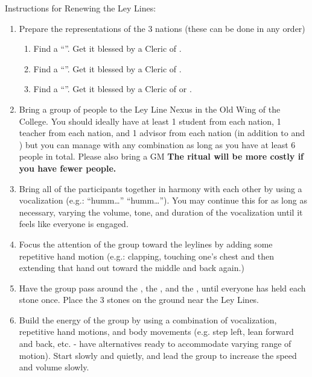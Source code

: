 \documentclass[green]{GL2020}
\begin{document}
Instructions for Renewing the Ley Lines:
\begin{enumerate}
  \item Prepare the representations of the 3 nations (these can be done in any order)
  \begin{enumerate}
    \item Find a ``\iClay{}''. Get it blessed by a Cleric of \cFarmGod{}.
    \item Find a ``\iObsidian{}''. Get it blessed by a Cleric of \cTechGod{}.
    \item Find a ``\iLimestone{}''. Get it blessed by a Cleric of \cEbb{} or \cFlow{}.
  \end{enumerate}  
  \item Bring a group of people to the Ley Line Nexus in the Old Wing of the College. You should ideally have at least 1 student from each nation, 1 teacher from each nation, and 1 advisor from each nation (in addition to \cBeetle{} and \cPrincipal{}) but you can manage with any combination as long as you have at least 6 people in total. Please also bring a GM \textbf{The ritual will be more costly if you have fewer people.}
  \item Bring all of the participants together in harmony with each other by using a vocalization (e.g.: “humm…” “humm…”). You may continue this for as long as necessary, varying the volume, tone, and duration of the vocalization until it feels like everyone is engaged.
  \item Focus the attention of the group toward the leylines by adding some repetitive hand motion (e.g.: clapping, touching one’s chest and then extending that hand out toward the middle and back again.)
  \item Have the group pass around the \iClay{}, the \iObsidian{}, and the \iLimestone{}, until everyone has held each stone once. Place the 3 stones on the ground near the Ley Lines.
  \item Build the energy of the group by using a combination of vocalization, repetitive hand motions, and body movements (e.g. step left, lean forward and back, etc. - have alternatives ready to accommodate varying range of motion). Start slowly and quietly, and lead the group to increase the speed and volume slowly.

\end{enumerate}
\end{document}
